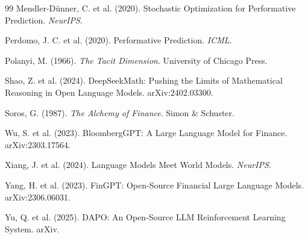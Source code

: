 \documentclass[11pt,a4paper]{article}
\begin{document}
\begin{thebibliography}{99}
Mendler-D\"{u}nner, C. et al. (2020).
Stochastic Optimization for Performative Prediction.
\textit{NeurIPS}.

Perdomo, J. C. et al. (2020).
Performative Prediction.
\textit{ICML}.

Polanyi, M. (1966).
\textit{The Tacit Dimension}. University of Chicago Press.

Shao, Z. et al. (2024).
DeepSeekMath: Pushing the Limits of Mathematical Reasoning in Open Language Models.
arXiv:2402.03300.

Soros, G. (1987).
\textit{The Alchemy of Finance}. Simon \& Schuster.

Wu, S. et al. (2023).
BloombergGPT: A Large Language Model for Finance.
arXiv:2303.17564.

Xiang, J. et al. (2024).
Language Models Meet World Models.
\textit{NeurIPS}.

Yang, H. et al. (2023).
FinGPT: Open-Source Financial Large Language Models.
arXiv:2306.06031.

Yu, Q. et al. (2025).
DAPO: An Open-Source LLM Reinforcement Learning System.
arXiv.

\end{thebibliography}
\end{document}
